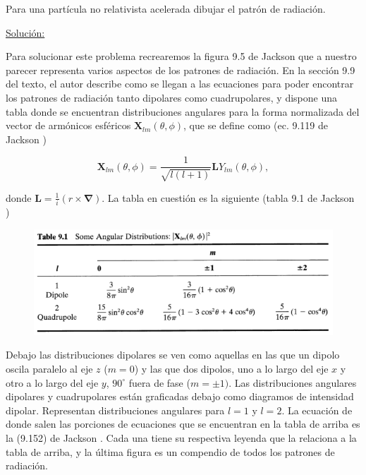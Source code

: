 \documentclass[a4paper,11pt]{article}
\numberwithin{equation}{section}
\begin{document}
Para una partícula no relativista acelerada dibujar el patrón de radiación.

\vspace{.3cm} \underline{Solución:} \vspace{.3cm}

Para solucionar este problema recrearemos la figura 9.5 de Jackson \cite{jackson} que 
a nuestro parecer representa varios aspectos de los patrones de radiación. En la 
sección 9.9 del texto, el autor describe como se llegan a las ecuaciones para 
poder encontrar los patrones de radiación tanto dipolares como cuadrupolares, 
y dispone una tabla donde se encuentran distribuciones angulares para la forma 
normalizada del vector de armónicos esféricos $\mathbf{X}_{lm}(\theta,\phi)$, que 
se define como (ec. 9.119 de Jackson \cite{jackson})

\begin{equation}
 \mathbf{X}_{lm}(\theta,\phi) = \frac{1}{\sqrt{l(l+1)}}\mathbf{L}Y_{lm}(\theta,\phi),
\end{equation}

donde $\mathbf{L} = \frac{1}{i}(r \times \pmb{\nabla})$. La tabla en cuestión 
es la siguiente (tabla 9.1 de Jackson \cite{jackson})

\begin{figure}[H]
 \center 
 \includegraphics[scale=0.5]{problema3fig1}
\end{figure}

Debajo las distribuciones dipolares se ven como aquellas en las que un dipolo 
oscila paralelo al eje $z$ ($m=0$) y las que dos dipolos, uno a lo largo del eje 
$x$ y otro a lo largo del eje $y$, $90^\circ$ fuera de fase ($m = \pm 1)$. Las 
distribuciones angulares dipolares y cuadrupolares están graficadas 
debajo como diagramos de intensidad dipolar. Representan distribuciones angulares 
para $l=1$ y $l=2$. La ecuación de donde salen las porciones de ecuaciones que 
se encuentran en la tabla de arriba es la (9.152) de Jackson \cite{jackson}. Cada 
una tiene su respectiva leyenda que la relaciona a la tabla de arriba, y la última 
figura es un compendio de todos los patrones de radiación.
\end{document}
